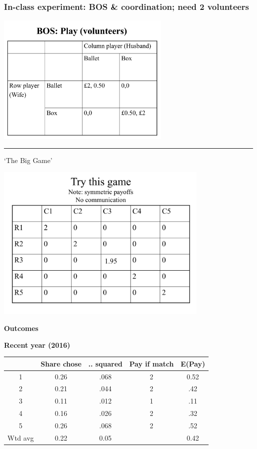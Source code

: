\documentclass[]{article}
\begin{document}
\hypertarget{in-class-experiment-bos-coordination-need-2-volunteers}{%
\subsubsection{In-class experiment: BOS \& coordination; need 2 volunteers}\label{in-class-experiment-bos-coordination-need-2-volunteers}}

\includegraphics[height=2.5in]{picsfigs/BOS_inlecture.png}

\begin{center}\rule{0.5\linewidth}{\linethickness}\end{center}

`The Big Game'

\includegraphics[height=3in]{picsfigs/coordgame_inlecture_mod.png}

\textbf{Outcomes}

\textbf{Recent year (2016)}

\begin{longtable}[]{@{}ccccc@{}}
\toprule
& Share chose & .. squared & Pay if match & E(Pay)\tabularnewline
\midrule
\endhead
1 & 0.26 & .068 & 2 & 0.52\tabularnewline
2 & 0.21 & .044 & 2 & .42\tabularnewline
3 & 0.11 & .012 & 1 & .11\tabularnewline
4 & 0.16 & .026 & 2 & .32\tabularnewline
5 & 0.26 & .068 & 2 & .52\tabularnewline
Wtd avg & 0.22 & 0.05 & & 0.42\tabularnewline
\bottomrule
\end{longtable}
\end{document}
